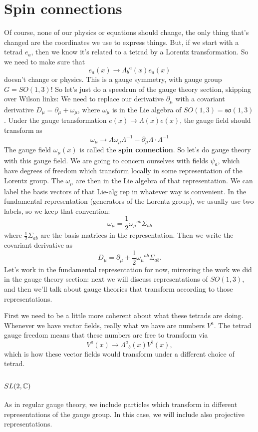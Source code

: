 \documentclass[main.tex]{subfiles}
\begin{document}
\section{Spin connections}
Of course, none of our physics or equations should change, the only thing that's changed are the coordinates we use to express things. But, if we start with a tetrad $e_a$, then we know it's related to a tetrad by a Lorentz transformation. So we need to make sure that
\[
e_a (x) \to {\Lambda_b}^{a} (x) e_a (x)
\]
doesn't change or physics. This is a gauge symmetry, with gauge group $G = SO(1,3)$! So let's just do a speedrun of the gauge theory section, skipping over Wilson links: We need to replace our derivative $\partial_\mu$ with a covariant derivative $D_\mu = \partial_\mu + \omega_\mu$, where $\omega_\mu$ is in the Lie algebra of $SO(1,3) = \mathfrak{so}(1,3)$. Under the gauge transformation $e(x) \to \Lambda(x) e(x)$, the gauge field should transform as
\[
\omega_\mu \to \Lambda \omega_\mu \Lambda^{-1} - \partial_\mu \Lambda \cdot \Lambda^{-1}
\]
The gauge field $\omega_\mu (x)$ is called the \textbf{spin connection}. So let's do gauge theory with this gauge field. We are going to concern ourselves with fields $\psi_a$, which have degrees of freedom which transform locally in some representation of the Lorentz group. The $\omega_\mu$ are then in the Lie algebra of that representation. We can label the basis vectors of that Lie-alg rep in whatever way is convenient. In the fundamental representation (generators of the Lorentz group), we usually use two labels, so we keep that convention:
\[
\omega_\mu = \frac{1}{2} {\omega_\mu}^{ab} \Sigma_{ab}
\]
where $\frac{1}{2} \Sigma_{ab}$ are the basis matrices in the representation. Then we write the covariant derivative as
\[
D_\mu = \partial_\mu + \frac{1}{2} {\omega_\mu}^{ab} \Sigma_{ab}.
\]
Let's work in the fundamental representation for now, mirroring the work we did in the gauge theory section: next we will discuss representations of $SO(1,3)$, and then we'll talk about gauge theories that transform according to those representations.

First we need to be a little more coherent about what these tetrads are doing. Whenever we have vector fields, really what we have are numbers $V^a$. The tetrad gauge freedom means that these numbers are free to transform via
\[
V^a (x) \to {\Lambda^a}_b (x) V^b (x),
\]
which is how these vector fields would transform under a different choice of tetrad. 

\newpage

\subsection{$SL(2,\mathbb{C})$}
As in regular gauge theory, we include particles which transform in different representations of the gauge group. In this case, we will include also projective representations.
\end{document}
